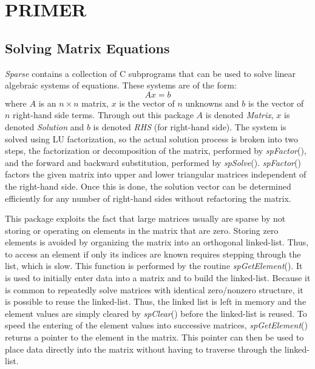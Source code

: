 \documentclass[11pt]{article}
\begin{document}
\section{PRIMER}
\subsection{Solving Matrix Equations}
\emph{Sparse} contains a collection of C subprograms that can be used to solve
linear algebraic systems of equations.  These systems are of the form:
\begin{equation}
    Ax = b
\end{equation}
where $A$ is an $n \times n$ matrix, $x$ is the vector of $n$
unknowns and $b$ is the vector of $n$ right-hand side terms.
Through out this package $A$ is denoted \emph{Matrix}, $x$ is
denoted \emph{Solution} and $b$ is denoted \emph{RHS} (for
right-hand side).  The system is solved using LU factorization, so the
actual solution process is broken into two steps, the factorization or
decomposition of the matrix, performed by \emph{spFactor}(), and the
forward and backward substitution, performed by \emph{spSolve}().
\emph{spFactor}() factors the given matrix into upper and lower
triangular matrices independent of the right-hand side.  Once this is
done, the solution vector can be determined efficiently for any number
of right-hand sides without refactoring the matrix.

This package exploits the fact that large matrices usually are sparse
by not storing or operating on elements in the matrix that are zero.
Storing zero elements is avoided by organizing the matrix into an
orthogonal linked-list.  Thus, to access an element if only its indices
are known requires stepping through the list, which is slow.  This
function is performed by the routine \emph{spGetElement}().  It is used to
initially enter data into a matrix and to build the linked-list.
Because it is common to repeatedly solve matrices with identical
zero/nonzero structure, it is possible to reuse the linked-list.  Thus,
the linked list is left in memory and the element values are simply
cleared by \emph{spClear}() before the linked-list is reused.  To speed the
entering of the element values into successive matrices,
\emph{spGetElement}() returns a pointer to the element in the matrix.
This pointer can then be used to place data directly into the matrix
without having to traverse through the linked-list.
\end{document}
